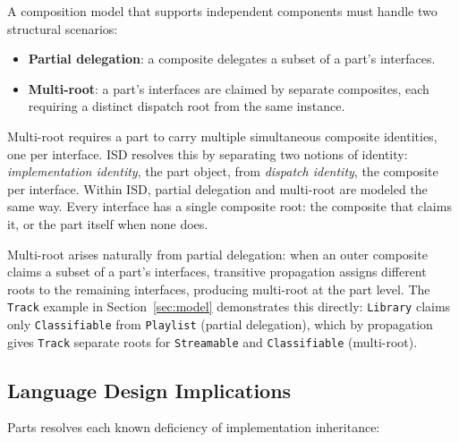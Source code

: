 \documentclass[acmsmall,nonacm]{acmart}
\theoremstyle{acmplain}
\theoremstyle{acmdefinition}
\newcommand{\code}[1]{\texttt{#1}}
\begin{document}
A composition model that supports independent components must handle two
structural scenarios:

\begin{itemize}
  \item \textbf{Partial delegation}: a composite delegates a subset of a
        part's interfaces.
  \item \textbf{Multi-root}: a part's interfaces are claimed by separate
        composites, each requiring a distinct dispatch root from the same
        instance.
\end{itemize}

Multi-root requires a part to carry multiple simultaneous
composite identities, one per interface. ISD resolves this by separating two
notions of identity: \emph{implementation identity}, the part object, from
\emph{dispatch identity}, the composite per interface. Within ISD, partial delegation and multi-root are modeled the same way. Every
interface has a single composite root: the composite that claims it, or the
part itself when none does.

Multi-root arises naturally from partial delegation: when an outer composite claims a subset of a
part's interfaces, transitive propagation assigns different roots to the
remaining interfaces, producing multi-root at the part level. The \code{Track} example in
Section~\ref{sec:model} demonstrates this directly: \code{Library} claims
only \code{Classifiable} from \code{Playlist} (partial delegation), which by propagation
gives \code{Track} separate roots for \code{Streamable} and
\code{Classifiable} (multi-root).

\subsection{Language Design Implications}

Parts resolves each known deficiency of implementation inheritance:
\end{document}
